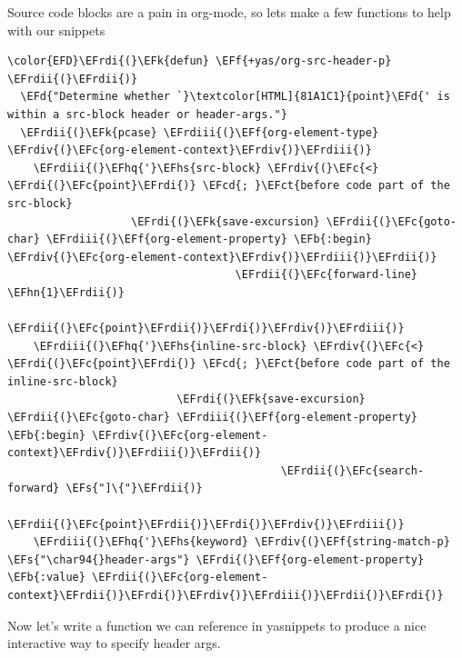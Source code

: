 \documentclass{scrartcl}
\newcommand{\EFk}[1]{\textcolor{EFk}{#1}} %
\newcommand{\EFd}[1]{\textcolor{EFd}{#1}} %
\newcommand{\EFs}[1]{\textcolor{EFs}{#1}} %
\newcommand{\EFb}[1]{\textcolor{EFb}{#1}} %
\newcommand{\EFct}[1]{\textcolor{EFct}{#1}} %
\newcommand{\EFc}[1]{\textcolor{EFc}{#1}} %
\newcommand{\EFf}[1]{\textcolor{EFf}{#1}} %
\newcommand{\EFcd}[1]{\textcolor{EFcd}{#1}} %
\newcommand{\EFhn}[1]{#1} %
\newcommand{\EFhq}[1]{#1} %
\newcommand{\EFhs}[1]{#1} %
\newcommand{\EFrdi}[1]{#1} %
\newcommand{\EFrdii}[1]{#1} %
\newcommand{\EFrdiii}[1]{#1} %
\newcommand{\EFrdiv}[1]{#1} %
\begin{document}
Source code blocks are a pain in org-mode, so lets make a few functions to help
with our snippets
\begin{Code}
\begin{Verbatim}[]
\color{EFD}\EFrdi{(}\EFk{defun} \EFf{+yas/org-src-header-p} \EFrdii{(}\EFrdii{)}
  \EFd{"Determine whether `}\textcolor[HTML]{81A1C1}{point}\EFd{' is within a src-block header or header-args."}
  \EFrdii{(}\EFk{pcase} \EFrdiii{(}\EFf{org-element-type} \EFrdiv{(}\EFc{org-element-context}\EFrdiv{)}\EFrdiii{)}
    \EFrdiii{(}\EFhq{'}\EFhs{src-block} \EFrdiv{(}\EFc{<} \EFrdi{(}\EFc{point}\EFrdi{)} \EFcd{; }\EFct{before code part of the src-block}
                   \EFrdi{(}\EFk{save-excursion} \EFrdii{(}\EFc{goto-char} \EFrdiii{(}\EFf{org-element-property} \EFb{:begin} \EFrdiv{(}\EFc{org-element-context}\EFrdiv{)}\EFrdiii{)}\EFrdii{)}
                                   \EFrdii{(}\EFc{forward-line} \EFhn{1}\EFrdii{)}
                                   \EFrdii{(}\EFc{point}\EFrdii{)}\EFrdi{)}\EFrdiv{)}\EFrdiii{)}
    \EFrdiii{(}\EFhq{'}\EFhs{inline-src-block} \EFrdiv{(}\EFc{<} \EFrdi{(}\EFc{point}\EFrdi{)} \EFcd{; }\EFct{before code part of the inline-src-block}
                          \EFrdi{(}\EFk{save-excursion} \EFrdii{(}\EFc{goto-char} \EFrdiii{(}\EFf{org-element-property} \EFb{:begin} \EFrdiv{(}\EFc{org-element-context}\EFrdiv{)}\EFrdiii{)}\EFrdii{)}
                                          \EFrdii{(}\EFc{search-forward} \EFs{"]\{"}\EFrdii{)}
                                          \EFrdii{(}\EFc{point}\EFrdii{)}\EFrdi{)}\EFrdiv{)}\EFrdiii{)}
    \EFrdiii{(}\EFhq{'}\EFhs{keyword} \EFrdiv{(}\EFf{string-match-p} \EFs{"\char94{}header-args"} \EFrdi{(}\EFf{org-element-property} \EFb{:value} \EFrdii{(}\EFc{org-element-context}\EFrdii{)}\EFrdi{)}\EFrdiv{)}\EFrdiii{)}\EFrdii{)}\EFrdi{)}
\end{Verbatim}
\end{Code}

Now let's write a function we can reference in yasnippets to produce a nice
interactive way to specify header args.
\end{document}
